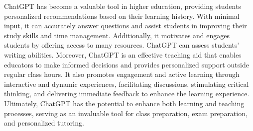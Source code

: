ChatGPT has become a valuable tool in higher education, providing students personalized recommendations
based on their learning history. With minimal input, it can accurately answer questions and assist students
in improving their study skills and time management. Additionally, it motivates and engages students by
offering access to many resources. ChatGPT can assess students' writing abilities\citep{mohammed_exploring_2023}.
Moreover, ChatGPT is an effective teaching aid that enables educators to make informed decisions and provides
personalized support outside regular class hours. It also promotes engagement and active learning through interactive
and dynamic experiences, facilitating discussions, stimulating critical thinking, and delivering immediate feedback
to enhance the learning experience\citep{schonberger_chatgpt_2023}.
Ultimately, ChatGPT has the potential to enhance both learning and teaching processes,
serving as an invaluable tool for class preparation, exam preparation, and personalized tutoring\citep{domenech_chatgpt_2023}.



